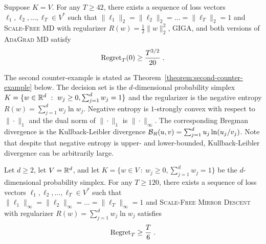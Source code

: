 \begin{theorem}
\label{theorem:first-counter-example}
Suppose $K = V$. For any $T \ge 42$, there exists a sequence of loss vectors
$\ell_1, \ell_2, \dots, \ell_T \in V^*$ such that $\|\ell_1\|_2 = \|\ell_2\|_2
= \dots = \|\ell_T\|_2 = 1$ and \textsc{Scale-Free MD} with
regularizer $R(w) = \frac{1}{2}\|w\|_2^2$, \textsc{GIGA},
and both versions of \textsc{AdaGrad MD} satisfy
$$
\operatorname{Regret}_T(0) \ge \frac{T^{3/2}}{20} \; .
$$
\end{theorem}

The second counter-example is stated as
Theorem~\ref{theorem:second-counter-example} below.  The decision set is the
$d$-dimensional probability simplex $K = \{ w \in \mathbb{R}^d ~:~ w_j \ge 0,
\sum_{j=1}^d w_j = 1 \}$ and the regularizer is the negative entropy $R(w) =
\sum_{j=1}^d w_j \ln w_j$.  Negative entropy is $1$-strongly convex with
respect to $\|\cdot\|_1$ and the dual norm of $\|\cdot\|_1$ is
\mbox{$\|\cdot\|_\infty$}.  The corresponding Bregman divergence is the
Kullback-Leibler divergence $\mathcal{B}_R(u,v) = \sum_{j=1}^d u_j \ln(u_j/v_j)$.
Note that despite that negative entropy is upper- and lower-bounded,
Kullback-Leibler divergence can be arbitrarily large.

\begin{theorem}
\label{theorem:second-counter-example}
Let $d \ge 2$, let $V = \mathbb{R}^d$, and let $K = \{ w \in V ~:~ w_j \ge 0,
\sum_{j=1}^d w_j = 1 \}$ be the $d$-dimensional probability simplex.  For any
$T \ge 120$, there exists a sequence of loss vectors $\ell_1, \ell_2, \dots,
\ell_T \in V^*$ such that $\|\ell_1\|_\infty = \|\ell_2\|_\infty = \dots =
\|\ell_T\|_\infty = 1$ and \textsc{Scale-Free Mirror Descent} with regularizer
$R(w) = \sum_{j=1}^d w_j \ln w_j$ satisfies
$$
\operatorname{Regret}_T \ge \frac{T}{6} \; .
$$
\end{theorem}
